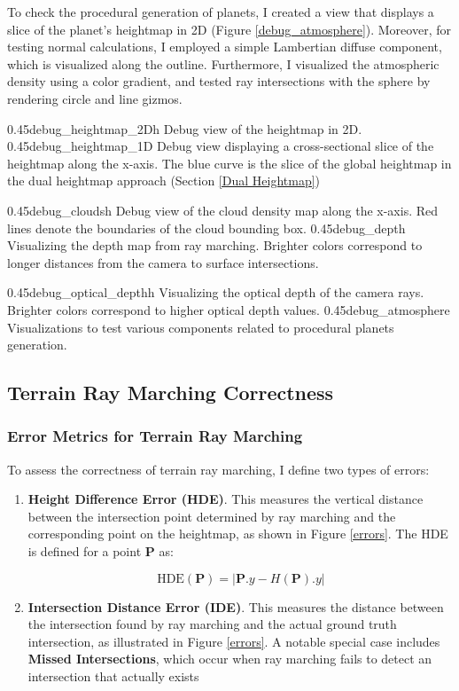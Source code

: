 To check the procedural generation of planets, I created a view that displays a slice of the planet's heightmap in 2D (Figure \ref{debug_atmosphere}). Moreover, for testing normal calculations, I employed a simple Lambertian diffuse component, which is visualized along the outline. Furthermore, I visualized the atmospheric density using a color gradient, and tested ray intersections with the sphere by rendering circle and line gizmos.

\myfigurerow
{0.45}{debug_heightmap_2D}{h}
{Debug view of the heightmap in 2D.}
{0.45}{debug_heightmap_1D}
{Debug view displaying a cross-sectional slice of the heightmap along the x-axis. The blue curve is the slice of the global heightmap in the dual heightmap approach (Section \ref{Dual Heightmap})}

\myfigurerow
{0.45}{debug_clouds}{h}
{Debug view of the cloud density map along the x-axis. Red lines denote the boundaries of the cloud bounding box.}
{0.45}{debug_depth}
{Visualizing the depth map from ray marching. Brighter colors correspond to longer distances from the camera to surface intersections.}

\myfigurerow
{0.45}{debug_optical_depth}{h}
{Visualizing the optical depth of the camera rays. Brighter colors correspond to higher optical depth values.}
{0.45}{debug_atmosphere}
{Visualizations to test various components related to procedural planets generation.}

\subsection{Terrain Ray Marching Correctness}

\subsubsection{Error Metrics for Terrain Ray Marching}

To assess the correctness of terrain ray marching, I define two types of errors:
\begin{enumerate}
    \item \textbf{Height Difference Error (HDE)}. This measures the vertical distance between the intersection point determined by ray marching and the corresponding point on the heightmap, as shown in Figure \ref{errors}. The HDE is defined for a point $\mathbf{P}$ as:

\begin{equation}
    \text{HDE}(\mathbf{P})=|\mathbf{P}.y-H(\mathbf{P}).y|
\end{equation}

    \item \textbf{Intersection Distance Error (IDE)}. This measures the distance between the intersection found by ray marching and the actual ground truth intersection, as illustrated in Figure \ref{errors}. A notable special case includes \textbf{Missed Intersections}, which occur when ray marching fails to detect an intersection that actually exists
\end{enumerate}

